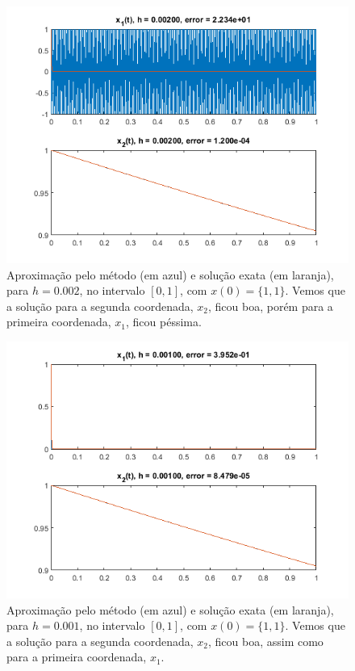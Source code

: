 \documentclass{article}
\begin{document}
\begin{enumerate}
\begin{enumerate}
                \begin{figure}[!h]
                    \centering
                    \includegraphics[width=\textwidth]{forward_2.png}
                    \caption{Aproximação pelo método (em azul) e
                    solução exata (em laranja), para $h = 0.002$,
                    no intervalo $[0, 1]$, com $x(0) = \{1, 1\}$.
                    Vemos que a solução para a segunda
                    coordenada, $x_2$, ficou boa, porém para a primeira
                    coordenada, $x_1$, ficou péssima.}
                    \label{fig:forward_2}
                \end{figure}
                
                \begin{figure}[!h]
                    \centering
                    \includegraphics[width=\textwidth]{forward_3.png}
                    \caption{Aproximação pelo método (em azul) e
                    solução exata (em laranja), para $h = 0.001$,
                    no intervalo $[0, 1]$, com $x(0) = \{1, 1\}$.
                    Vemos que a solução para a segunda
                    coordenada, $x_2$, ficou boa, assim como para a primeira
                    coordenada, $x_1$.}
                    \label{fig:forward_3}
                \end{figure}


\end{enumerate}
\end{enumerate}
\end{document}
